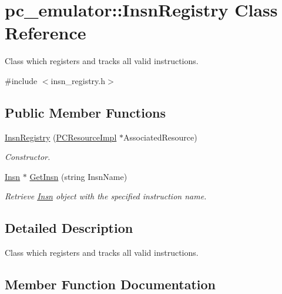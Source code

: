 \hypertarget{classpc__emulator_1_1InsnRegistry}{}\section{pc\+\_\+emulator\+:\+:Insn\+Registry Class Reference}
\label{classpc__emulator_1_1InsnRegistry}


Class which registers and tracks all valid instructions.  




{\ttfamily \#include $<$insn\+\_\+registry.\+h$>$}

\subsection*{Public Member Functions}
\begin{DoxyCompactItemize}
\item 
\hyperlink{classpc__emulator_1_1InsnRegistry_aaa8126e6e72a71a8a13147585ff8e110}{Insn\+Registry} (\hyperlink{classpc__emulator_1_1PCResourceImpl}{P\+C\+Resource\+Impl} $\ast$Associated\+Resource)\hypertarget{classpc__emulator_1_1InsnRegistry_aaa8126e6e72a71a8a13147585ff8e110}{}\label{classpc__emulator_1_1InsnRegistry_aaa8126e6e72a71a8a13147585ff8e110}

\begin{DoxyCompactList}\small\item\em Constructor. \end{DoxyCompactList}\item 
\hyperlink{classpc__emulator_1_1Insn}{Insn} $\ast$ \hyperlink{classpc__emulator_1_1InsnRegistry_ab07163f65b9c0d0a472392c365ffbc1b}{Get\+Insn} (string Insn\+Name)
\begin{DoxyCompactList}\small\item\em Retrieve \hyperlink{classpc__emulator_1_1Insn}{Insn} object with the specified instruction name. \end{DoxyCompactList}\end{DoxyCompactItemize}


\subsection{Detailed Description}
Class which registers and tracks all valid instructions. 

\subsection{Member Function Documentation}
